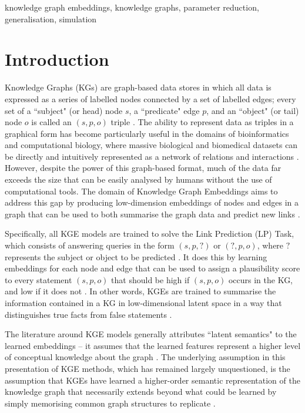 \begin{IEEEkeywords}
knowledge graph embeddings, knowledge graphs, parameter reduction, generalisation, simulation
\end{IEEEkeywords}

\section{Introduction}
Knowledge Graphs (KGs) are graph-based data stores in which all data is expressed as a series of labelled nodes connected by a set of labelled edges; every set of a ``subject" (or head) node $s$, a ``predicate" edge $p$, and an ``object" (or tail) node $o$ is called an $(s,p,o)$ triple \cite{kg-ovewview}. The ability to represent data as triples in a graphical form has become particularly useful in the domains of bioinformatics and computational biology, where massive biological and biomedical datasets can be directly and intuitively represented as a network of relations and interactions \cite{bio2rdf,umls,biokg,ckg,drkg,ogb,PharmKG,OpenBioLink}. However, despite the power of this graph-based format, much of the data far exceeds the size that can be easily analysed by humans without the use of computational tools. The domain of Knowledge Graph Embeddings aims to address this gap by producing low-dimension embeddings of nodes and edges in a graph that can be used to both summarise the graph data and predict new links \cite{kge-survey,rml-review,kge-completion-rev,kg-ovewview}.

Specifically, all KGE models are trained to solve the Link Prediction (LP) Task, which consists of answering queries in the form $(s,p,?)$ or $(?,p,o)$, where $?$ represents the subject or object to be predicted \cite{kge-survey,rml-review,kge-completion-rev,kg-ovewview}. It does this by learning embeddings for each node and edge that can be used to assign a plausibility score to every statement $(s,p,o)$ that should be high if $(s,p,o)$ occurs in the KG, and low if it does not \cite{light-into-the-dark,kge-survey,rml-review,kge-completion-rev,kg-ovewview}. In other words, KGEs are trained to summarise the information contained in a KG in low-dimensional latent space in a way that distinguishes true facts from false statements \cite{kge-survey,rml-review,kge-completion-rev,kg-ovewview}.

The literature around KGE models generally attributes ``latent semantics" to the learned embeddings -- it assumes that the learned features represent a higher level of conceptual knowledge about the graph \cite{kge-survey,rml-review,kge-completion-rev}. The underlying assumption in this presentation of KGE methods, which has remained largely unquestioned, is the assumption that KGEs have learned a higher-order semantic representation of the knowledge graph that necessarily extends beyond what could be learned by simply memorising common graph structures to replicate \cite{kge-survey,rml-review,kge-completion-rev}. 

